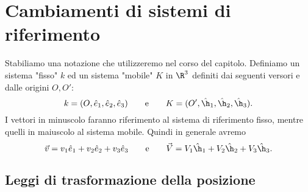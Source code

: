 \chapter{Cambiamenti di sistemi di riferimento}
%
%
Stabiliamo una notazione che utilizzeremo nel corso del capitolo.
Definiamo un sistema "fisso" \(k\) ed un sistema "mobile" \(K\) in \(\R^3\) definiti dai seguenti versori e dalle origini \(O,O'\):
\[
	k = (O,\hat{e}_1,\hat{e}_2,\hat{e}_3) \qquad\text{e}\qquad K = (O',\hat{\h}_1,\hat{\h}_2,\hat{\h}_3).
\]
I vettori in minuscolo faranno riferimento al sistema di riferimento fisso, mentre quelli in maiuscolo al sistema mobile. Quindi in generale avremo
\[
	\vec{v} = v_1\hat{e}_1 + v_2\hat{e}_2 + v_3\hat{e}_3 \qquad\text{e}\qquad \vec{V} = V_1\hat{\h}_1 + V_2\hat{\h}_2 + V_3\hat{\h}_3.
\]
\section{Leggi di trasformazione della posizione}

